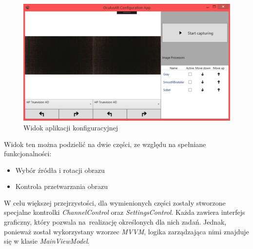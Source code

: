\documentclass[a4paper,11pt,twoside]{report}
\theoremstyle{definition}
\begin{document}
\begin{figure}[h]
\centering
\includegraphics[scale=0.4]{images/mainwindow_screen}
\caption[Widok aplikacji]{Widok aplikacji konfiguracyjnej}
\end{figure}

Widok ten można podzielić na dwie części, ze względu na spełniane funkcjonalności:
\begin{itemize}
\item Wybór źródła i rotacji obrazu
\item Kontrola przetwarzania obrazu
\end{itemize}

W celu większej przejrzystości, dla wymienionych części zostały stworzone specjalne kontrolki \textit{ChannelControl} oraz \textit{SettingsControl}. Każda zawiera interfejs graficzny, który pozwala na~realizację określonych dla nich zadań. Jednak, ponieważ został wykorzystany wzorzec \textit{MVVM}, logika zarządzająca nimi znajduje się w klasie \textit{MainViewModel}. 
\end{document}
